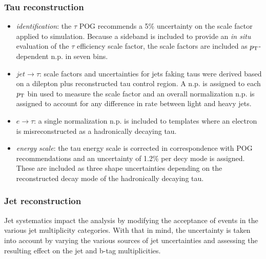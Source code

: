 \subsubsection{Tau reconstruction}
    \begin{itemize}
        \item \textit{identification}: the $\tau$ POG recommends a 5\%
            uncertainty on the scale factor applied to simulation.
            Because a sideband is included to provide an \emph{in situ}
            evaluation of the $\tau$ efficiency scale factor, the scale
            factors are included as $p_{\mathrm{T}}$-dependent n.p. in seven \pt
            bins.
        \item \textit{$jet\rightarrow\tau$}: scale factors and
            uncertainties for jets faking taus were derived based on a
            dilepton plus reconstructed tau control region.  A n.p. is
            assigned to each $p_{\mathrm{T}}$ bin used to measure the scale factor
            and an overall normalization n.p. is assigned to account for
            any difference in rate between light and heavy jets.
        \item \textit{$e\rightarrow\tau$}: a single normalization n.p.
            is included to templates where an electron is
            misreconstructed as a hadronically decaying tau.
        \item \textit{energy scale}: the tau energy scale is corrected in
            correspondence with POG recommendations and an uncertainty
            of 1.2\% per decy mode is assigned.  These are included as
            three shape uncertainties depending on the reconstructed
            decay mode of the hadronically decaying tau.
    \end{itemize}

\subsubsection{Jet reconstruction}

    Jet systematics impact the analysis by modifying the acceptance of
    events in the various jet multiplicity categories.  With that in
    mind, the uncertainty is taken into account by varying the various
    sources of jet uncertainties and assessing the resulting effect on
    the jet and b-tag multiplicities.

